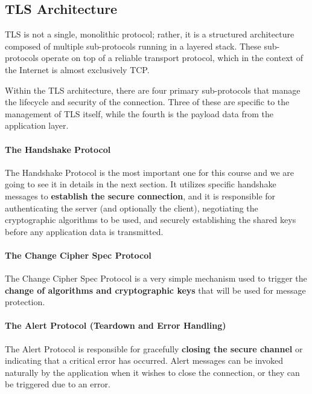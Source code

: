\subsection{TLS Architecture}

TLS is not a single, monolithic protocol; rather, it is a structured architecture composed of multiple sub-protocols running in a layered stack. These sub-protocols operate on top of a reliable transport protocol, which in the context of the Internet is almost exclusively TCP.



Within the TLS architecture, there are four primary sub-protocols that manage the lifecycle and security of the connection. Three of these are specific to the management of TLS itself, while the fourth is the payload data from the application layer.

\paragraph{The Handshake Protocol}
The Handshake Protocol is the most important one for this course and we are going to see it in details in the next section. It utilizes specific handshake messages to \textbf{establish the secure connection}, and it is responsible for authenticating the server (and optionally the client), negotiating the cryptographic algorithms to be used, and securely establishing the shared keys before any application data is transmitted.

\paragraph{The Change Cipher Spec Protocol}
The Change Cipher Spec Protocol is a very simple mechanism used to trigger the \textbf{change of algorithms and cryptographic keys} that will be used for message protection.

\paragraph{The Alert Protocol (Teardown and Error Handling)}
The Alert Protocol is responsible for gracefully \textbf{closing the secure channel} or indicating that a critical error has occurred. Alert messages can be invoked naturally by the application when it wishes to close the connection, or they can be triggered due to an error.

